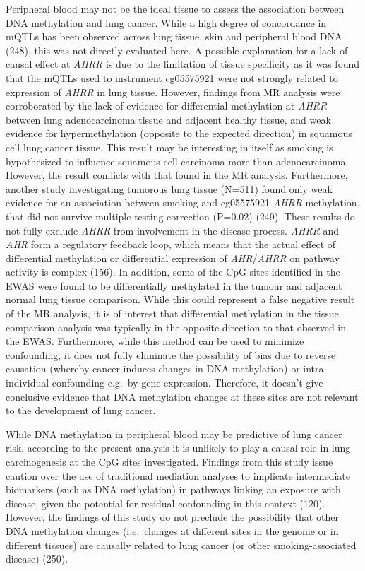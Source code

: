 \documentclass[11pt,twoside]{bristolthesis}
\begin{document}
Peripheral blood may not be the ideal tissue to assess the association between DNA methylation and lung cancer. While a high degree of concordance in mQTLs has been observed across lung tissue, skin and peripheral blood DNA (248), this was not directly evaluated here. A possible explanation for a lack of causal effect at \emph{AHRR} is due to the limitation of tissue specificity as it was found that the mQTLs used to instrument cg05575921 were not strongly related to expression of \emph{AHRR} in lung tissue. However, findings from MR analysis were corroborated by the lack of evidence for differential methylation at \emph{AHRR} between lung adenocarcinoma tissue and adjacent healthy tissue, and weak evidence for hypermethylation (opposite to the expected direction) in squamous cell lung cancer tissue. This result may be interesting in itself as smoking is hypothesized to influence squamous cell carcinoma more than adenocarcinoma. However, the result conflicts with that found in the MR analysis. Furthermore, another study investigating tumorous lung tissue (N=511) found only weak evidence for an association between smoking and cg05575921 \emph{AHRR} methylation, that did not survive multiple testing correction (P=0.02) (249). These results do not fully exclude \emph{AHRR} from involvement in the disease process. \emph{AHRR} and \emph{AHR} form a regulatory feedback loop, which means that the actual effect of differential methylation or differential expression of \emph{AHR}/\emph{AHRR} on pathway activity is complex (156). In addition, some of the CpG sites identified in the EWAS were found to be differentially methylated in the tumour and adjacent normal lung tissue comparison. While this could represent a false negative result of the MR analysis, it is of interest that differential methylation in the tissue comparison analysis was typically in the opposite direction to that observed in the EWAS. Furthermore, while this method can be used to minimize confounding, it does not fully eliminate the possibility of bias due to reverse causation (whereby cancer induces changes in DNA methylation) or intra-individual confounding e.g.~by gene expression. Therefore, it doesn't give conclusive evidence that DNA methylation changes at these sites are not relevant to the development of lung cancer.

While DNA methylation in peripheral blood may be predictive of lung cancer risk, according to the present analysis it is unlikely to play a causal role in lung carcinogenesis at the CpG sites investigated. Findings from this study issue caution over the use of traditional mediation analyses to implicate intermediate biomarkers (such as DNA methylation) in pathways linking an exposure with disease, given the potential for residual confounding in this context (120). However, the findings of this study do not preclude the possibility that other DNA methylation changes (i.e.~changes at different sites in the genome or in different tissues) are causally related to lung cancer (or other smoking-associated disease) (250).
\end{document}
